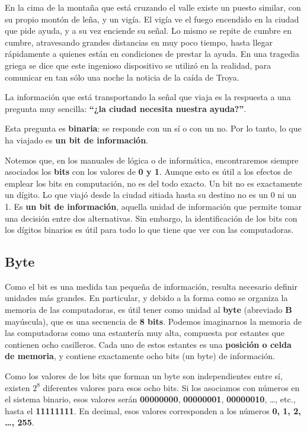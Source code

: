 \documentclass[spanish,a4paper,]{article}
\begin{document}
En la cima de la montaña que está cruzando el valle existe un puesto
similar, con su propio montón de leña, y un vigía. El vigía ve el fuego
encendido en la ciudad que pide ayuda, y a su vez enciende su señal. Lo
mismo se repite de cumbre en cumbre, atravesando grandes distancias en
muy poco tiempo, hasta llegar rápidamente a quienes están en condiciones
de prestar la ayuda. En una tragedia griega se dice que este ingenioso
dispositivo se utilizó en la realidad, para comunicar en tan sólo una
noche la noticia de la caída de Troya.

La información que está transportando la señal que viaja es la respuesta
a una pregunta muy sencilla: \textbf{``¿la ciudad necesita nuestra
ayuda?''}.

Esta pregunta es \textbf{binaria}: se responde con un sí o con un no.
Por lo tanto, lo que ha viajado es \textbf{un bit de información}.

Notemos que, en los manuales de lógica o de informática, encontraremos
siempre asociados los \textbf{bits} con los valores de \textbf{0 y 1}.
Aunque esto es útil a los efectos de emplear los bits en computación, no
es del todo exacto. Un bit no es exactamente un dígito. Lo que viajó
desde la ciudad sitiada hasta su destino no es un 0 ni un 1. Es
\textbf{un bit de información}, aquella unidad de información que
permite tomar una decisión entre dos alternativas. Sin embargo, la
identificación de los bits con los dígitos binarios es útil para todo lo
que tiene que ver con las computadoras.

\hypertarget{byte}{%
\subsection{Byte}\label{byte}}

Como el bit es una medida tan pequeña de información, resulta necesario
definir unidades más grandes. En particular, y debido a la forma como se
organiza la memoria de las computadoras, es útil tener como unidad al
\textbf{byte} (abreviado \textbf{B} mayúscula), que es una secuencia de
\textbf{8 bits}. Podemos imaginarnos la memoria de las computadoras como
una estantería muy alta, compuesta por estantes que contienen ocho
casilleros. Cada uno de estos estantes es una \textbf{posición o celda
de memoria}, y contiene exactamente ocho bits (un byte) de información.

Como los valores de los bits que forman un byte son independientes entre
sí, existen \(2^8\) diferentes valores para esos ocho bits. Si los
asociamos con números en el sistema binario, esos valores serán
\textbf{00000000}, \textbf{00000001}, \textbf{00000010}, \ldots{}, etc.,
hasta el \textbf{11111111}. En decimal, esos valores corresponden a los
números \textbf{0, 1, 2, \ldots{}, 255}.
\end{document}
